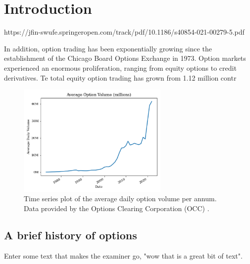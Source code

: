 \chapter{Introduction}

https://jfin-swufe.springeropen.com/track/pdf/10.1186/s40854-021-00279-5.pdf

In addition,
option trading has been exponentially growing since the establishment of the Chicago
Board Options Exchange in 1973. Option markets experienced an enormous proliferation, ranging from equity options to credit derivatives. Te total equity option trading
has grown from 1.12 million contr

\begin{figure}[H]
    \centering
    \includegraphics[width=0.65\textwidth]{Chapters/C1/plots/OptionVolume.png}
    \caption{Time series plot of the average daily option volume per annum. Data provided by the Options Clearing Corporation (OCC) \cite{THEOCC}.}
    \label{C1fig:OptionVolume}
\end{figure}

\section{A brief history of options}

Enter some text that makes the examiner go, "wow that is a great bit of text". 

